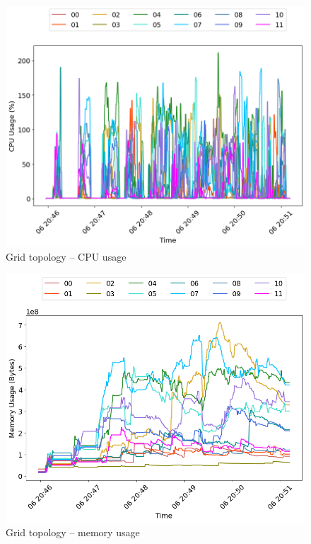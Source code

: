 \begin{minipage}{0.5\linewidth}
\begin{figure}[H]
\captionsetup{justification=centering,width=0.8\linewidth}
\includegraphics[width=\linewidth]{figures/grid/cpu_usage.png}
\caption{Grid topology -- CPU usage}
\label{fig:grid-blk_read}
\end{figure}
\end{minipage}
\begin{minipage}{0.5\linewidth}
\begin{figure}[H]
\captionsetup{justification=centering,width=0.8\linewidth}
\includegraphics[width=\linewidth]{figures/grid/mem_usage.png}
\caption{Grid topology -- memory usage}
\label{fig:grid-blk_write}
\end{figure}
\end{minipage}

